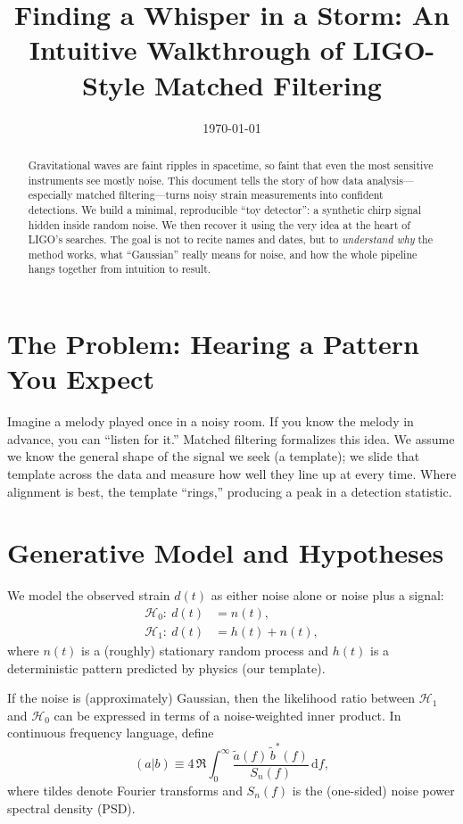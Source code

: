 \documentclass[11pt,a4paper]{article}
\title{Finding a Whisper in a Storm: An Intuitive Walkthrough of LIGO-Style Matched Filtering}
\author{}
\date{\today}
\begin{document}
\maketitle

\begin{abstract}
Gravitational waves are faint ripples in spacetime, so faint that even the most sensitive instruments see mostly noise. This document tells the story of how data analysis---especially matched filtering---turns noisy strain measurements into confident detections. We build a minimal, reproducible ``toy detector'': a synthetic chirp signal hidden inside random noise. We then recover it using the very idea at the heart of LIGO's searches. The goal is not to recite names and dates, but to \emph{understand why} the method works, what ``Gaussian'' really means for noise, and how the whole pipeline hangs together from intuition to result.
\end{abstract}

\section{The Problem: Hearing a Pattern You Expect}
Imagine a melody played once in a noisy room. If you know the melody in advance, you can ``listen for it.'' Matched filtering formalizes this idea. We assume we know the general shape of the signal we seek (a template); we slide that template across the data and measure how well they line up at every time. Where alignment is best, the template ``rings,'' producing a peak in a detection statistic.

\section{Generative Model and Hypotheses}
We model the observed strain $d(t)$ as either noise alone or noise plus a signal:
\begin{align}
\mathcal{H}_0:~ d(t) &= n(t), \label{eq:h0}\\
\mathcal{H}_1:~ d(t) &= h(t) + n(t), \label{eq:h1}
\end{align}
where $n(t)$ is a (roughly) stationary random process and $h(t)$ is a deterministic pattern predicted by physics (our template).

If the noise is (approximately) Gaussian, then the likelihood ratio between $\mathcal{H}_1$ and $\mathcal{H}_0$ can be expressed in terms of a noise-weighted inner product. In continuous frequency language, define
\begin{equation}
(a|b) \equiv 4\,\Re \int_{0}^{\infty} \frac{\tilde a(f)\,\tilde b^{*}(f)}{S_n(f)}\,\mathrm{d}f, \label{eq:inner}
\end{equation}
where tildes denote Fourier transforms and $S_n(f)$ is the (one-sided) noise power spectral density (PSD).
\end{document}
